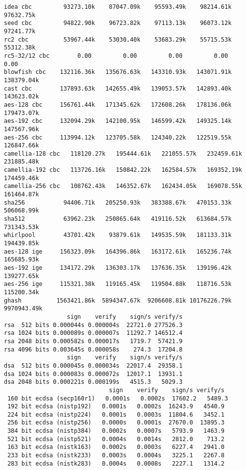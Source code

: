 \documentclass[%
 aip,
 jmp,%
 amsmath,amssymb,
 reprint,%
]{revtex4-1}
\begin{document}
\begin{verbatim}
idea cbc         93273.10k    87047.09k    95593.49k    98214.61k    97632.75k
seed cbc         94822.90k    96723.82k    97113.13k    96073.12k    97241.77k
rc2 cbc          53967.44k    53030.40k    53683.29k    55715.53k    55312.38k
rc5-32/12 cbc        0.00         0.00         0.00         0.00         0.00 
blowfish cbc    132116.36k   135676.63k   143310.93k   143071.91k   138379.04k
cast cbc        137893.63k   142655.49k   139053.57k   142893.40k   143623.02k
aes-128 cbc     156761.44k   171345.62k   172608.26k   178136.06k   179473.07k
aes-192 cbc     132094.29k   142100.95k   146599.42k   149325.14k   147567.96k
aes-256 cbc     113994.12k   123705.58k   124340.22k   122519.55k   126847.66k
camellia-128 cbc   118120.27k   195444.61k   221055.57k   232459.61k   231885.48k
camellia-192 cbc   113726.16k   150842.22k   162584.57k   169352.19k   174459.46k
camellia-256 cbc   108762.43k   146352.67k   162434.05k   169078.55k   161464.87k
sha256           94406.71k   205250.93k   383388.67k   470153.33k   506068.99k
sha512           63962.23k   250865.64k   419116.52k   613684.57k   731343.53k
whirlpool        43701.42k    93879.61k   149535.59k   181133.31k   194439.85k
aes-128 ige     156323.09k   164396.86k   163172.61k   165236.74k   165685.93k
aes-192 ige     134172.29k   136303.17k   137636.35k   139196.42k   139277.65k
aes-256 ige     115321.38k   119165.45k   119504.88k   118716.53k   115200.34k
ghash          1563421.86k  5894347.67k  9206608.81k 10176226.79k  9970943.49k
                  sign    verify    sign/s verify/s
rsa  512 bits 0.000044s 0.000004s  22721.0 277526.3
rsa 1024 bits 0.000089s 0.000007s  11292.7 146512.4
rsa 2048 bits 0.000582s 0.000017s   1719.7  57421.9
rsa 4096 bits 0.003645s 0.000058s    274.3  17204.8
                  sign    verify    sign/s verify/s
dsa  512 bits 0.000045s 0.000034s  22017.4  29358.1
dsa 1024 bits 0.000083s 0.000072s  12017.1  13931.1
dsa 2048 bits 0.000221s 0.000199s   4515.3   5029.3
                              sign    verify    sign/s verify/s
 160 bit ecdsa (secp160r1)   0.0001s   0.0002s  17602.2   5489.3
 192 bit ecdsa (nistp192)   0.0001s   0.0002s  16243.9   4540.9
 224 bit ecdsa (nistp224)   0.0001s   0.0003s  11804.6   3452.1
 256 bit ecdsa (nistp256)   0.0000s   0.0001s  27670.0  13895.3
 384 bit ecdsa (nistp384)   0.0002s   0.0007s   5793.9   1463.9
 521 bit ecdsa (nistp521)   0.0004s   0.0014s   2812.0    713.2
 163 bit ecdsa (nistk163)   0.0002s   0.0003s   6227.4   2941.0
 233 bit ecdsa (nistk233)   0.0003s   0.0004s   3225.1   2267.8
 283 bit ecdsa (nistk283)   0.0004s   0.0008s   2227.1   1314.2

\end{verbatim}
\end{document}
